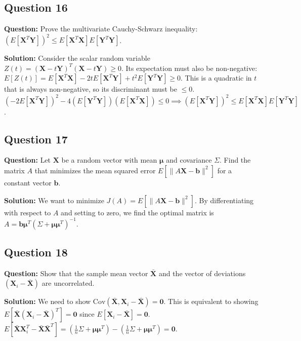 \subsection*{Question 16}
\textbf{Question:} Prove the multivariate Cauchy-Schwarz inequality: $(E[\mathbf{X}^T\mathbf{Y}])^2 \le E[\mathbf{X}^T\mathbf{X}] E[\mathbf{Y}^T\mathbf{Y}]$.

\textbf{Solution:}
Consider the scalar random variable $Z(t) = (\mathbf{X} - t\mathbf{Y})^T(\mathbf{X} - t\mathbf{Y}) \ge 0$.
Its expectation must also be non-negative: $E[Z(t)] = E[\mathbf{X}^T\mathbf{X}] - 2tE[\mathbf{X}^T\mathbf{Y}] + t^2E[\mathbf{Y}^T\mathbf{Y}] \ge 0$.
This is a quadratic in $t$ that is always non-negative, so its discriminant must be $\le 0$.
$(-2E[\mathbf{X}^T\mathbf{Y}])^2 - 4(E[\mathbf{Y}^T\mathbf{Y}])(E[\mathbf{X}^T\mathbf{X}]) \le 0 \implies (E[\mathbf{X}^T\mathbf{Y}])^2 \le E[\mathbf{X}^T\mathbf{X}] E[\mathbf{Y}^T\mathbf{Y}]$.

\subsection*{Question 17}
\textbf{Question:} Let $\mathbf{X}$ be a random vector with mean $\boldsymbol{\mu}$ and covariance $\Sigma$. Find the matrix $A$ that minimizes the mean squared error $E[\|A\mathbf{X} - \mathbf{b}\|^2]$ for a constant vector $\mathbf{b}$.

\textbf{Solution:}
We want to minimize $J(A) = E[\|A\mathbf{X} - \mathbf{b}\|^2]$. By differentiating with respect to $A$ and setting to zero, we find the optimal matrix is $A = \mathbf{b}\boldsymbol{\mu}^T (\Sigma + \boldsymbol{\mu}\boldsymbol{\mu}^T)^{-1}$.

\subsection*{Question 18}
\textbf{Question:} Show that the sample mean vector $\bar{\mathbf{X}}$ and the vector of deviations $(\mathbf{X}_i - \bar{\mathbf{X}})$ are uncorrelated.

\textbf{Solution:}
We need to show $\text{Cov}(\bar{\mathbf{X}}, \mathbf{X}_i - \bar{\mathbf{X}}) = \mathbf{0}$.
This is equivalent to showing $E[\bar{\mathbf{X}}(\mathbf{X}_i - \bar{\mathbf{X}})^T] = \mathbf{0}$ since $E[\mathbf{X}_i - \bar{\mathbf{X}}] = \mathbf{0}$.
$E[\bar{\mathbf{X}}\mathbf{X}_i^T - \bar{\mathbf{X}}\bar{\mathbf{X}}^T] = (\frac{1}{n}\Sigma + \boldsymbol{\mu}\boldsymbol{\mu}^T) - (\frac{1}{n}\Sigma + \boldsymbol{\mu}\boldsymbol{\mu}^T) = \mathbf{0}$.

